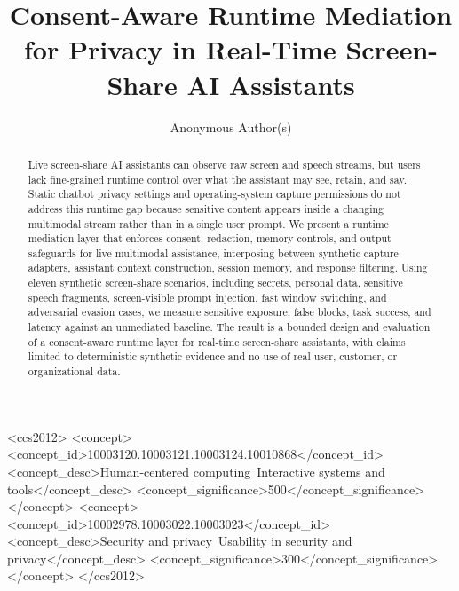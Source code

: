 \documentclass[manuscript,review,anonymous]{acmart}
\title{Consent-Aware Runtime Mediation for Privacy in Real-Time Screen-Share AI Assistants}
\author{Anonymous Author(s)}
\affiliation{%
  \institution{Anonymous Institution}
  \country{Anonymous Country}}
\begin{document}
\begin{abstract}
Live screen-share AI assistants can observe raw screen and speech streams, but users lack fine-grained runtime control over what the assistant may see, retain, and say. Static chatbot privacy settings and operating-system capture permissions do not address this runtime gap because sensitive content appears inside a changing multimodal stream rather than in a single user prompt. We present a runtime mediation layer that enforces consent, redaction, memory controls, and output safeguards for live multimodal assistance, interposing between synthetic capture adapters, assistant context construction, session memory, and response filtering. Using eleven synthetic screen-share scenarios, including secrets, personal data, sensitive speech fragments, screen-visible prompt injection, fast window switching, and adversarial evasion cases, we measure sensitive exposure, false blocks, task success, and latency against an unmediated baseline. The result is a bounded design and evaluation of a consent-aware runtime layer for real-time screen-share assistants, with claims limited to deterministic synthetic evidence and no use of real user, customer, or organizational data.
\end{abstract}

\begin{CCSXML}
<ccs2012>
 <concept>
  <concept_id>10003120.10003121.10003124.10010868</concept_id>
  <concept_desc>Human-centered computing~Interactive systems and tools</concept_desc>
  <concept_significance>500</concept_significance>
 </concept>
 <concept>
  <concept_id>10002978.10003022.10003023</concept_id>
  <concept_desc>Security and privacy~Usability in security and privacy</concept_desc>
  <concept_significance>300</concept_significance>
 </concept>
</ccs2012>
\end{CCSXML}


\maketitle
\end{document}

